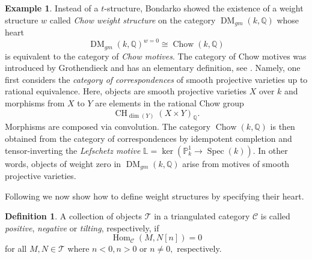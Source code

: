 \documentclass{amsart}
\theoremstyle{plain}
\theoremstyle{TheoremNum}
\theoremstyle{definition}
\newtheorem{example}[theorem]{Example}
\newtheorem{definition}[theorem]{Definition}
\theoremstyle{remark}
\numberwithin{equation}{section}
\newcommand{\Q}{\mathbb{Q}}
\newcommand{\Z}{\mathbb{Z}}
\newcommand{\Cc}{\mathcal{C}}
\newcommand{\Tt}{\mathcal{T}}
\newcommand{\Chow}{\operatorname{CH}}
\newcommand{\DM}{\operatorname{DM}}
\newcommand{\Hom}{\operatorname{Hom}}
\newcommand{\Spec}{\operatorname{Spec}}
\begin{document}
\begin{example}
Instead of a $t$-structure, Bondarko \cite{bondarko_weight_2010} showed the existence of a weight structure $w$ called \emph{Chow weight structure} on the category $\DM_{gm}(k,\Q)$ whose heart
$$\DM_{gm}(k,\Q)^{w=0}\cong\operatorname{Chow}(k,\Q)$$
is equivalent to the category of \emph{Chow motives}. The category of Chow motives was introduced by Grothendieck and has an elementary definition, see \cite{milne_motives_2012}. Namely, one first considers the \emph{category of correspondences} of smooth projective varieties up to rational equivalence. Here, objects are smooth projective varieties $X$ over $k$ and morphisms from $X$ to $Y$ are elements in the rational Chow group
$$\Chow_{\dim(Y)}(X\times Y)_\Q.$$
Morphisms are composed via convolution. The category $\operatorname{Chow}(k,\Q)$ is then obtained from the category of correspondences by idempotent completion and tensor-inverting the \emph{Lefschetz motive} $\mathbb{L}=\ker(\mathbb{P}_k^1\to \Spec(k)).$
In other words, objects of weight zero in $\DM_{gm}(k,\Q)$ arise from motives of smooth projective varieties. 
\end{example}
Following \cite[Theorem 4.3.2]{bondarko_weight_2010} we now show how to define weight structures by specifying their heart.
\begin{definition}\label{def:tilting} A collection of objects $\Tt$ in a triangulated category $\Cc$ is called \emph{positive}, \emph{negative} or \emph{tilting}, respectively, if 
$$\Hom_\Cc(M,N[n])=0$$
for all $M,N\in\Tt$ where $n<0, n>0$ or $n\neq 0,$ respectively.
\end{definition}
\end{document}
